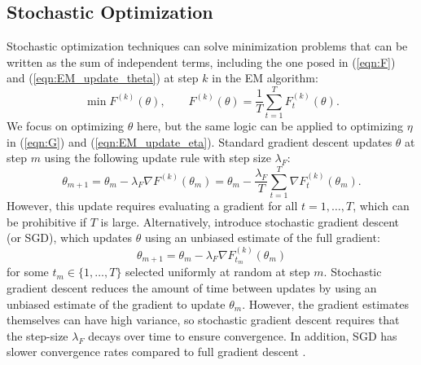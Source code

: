 \subsection{Stochastic Optimization}

Stochastic optimization techniques can solve minimization problems that can be written as the sum of independent terms, including the one posed in (\ref{eqn:F}) and (\ref{eqn:EM_update_theta}) at step $k$ in the EM algorithm:
%
\begin{equation*}
    \min F^{(k)}(\theta), \qquad F^{(k)}(\theta) = \frac{1}{T}\sum_{t = 1}^T F^{(k)}_t(\theta).
\end{equation*}
%
We focus on optimizing $\theta$ here, but the same logic can be applied to optimizing $\eta$ in (\ref{eqn:G}) and (\ref{eqn:EM_update_eta}).
%
Standard gradient descent updates $\theta$ at step $m$ using the following update rule with step size $\lambda_F$:
%
\begin{equation*}
    \theta_{m+1} = \theta_{m} - \lambda_F \nabla F^{(k)}(\theta_{m}) =  \theta_{m} - \frac{\lambda_F}{T} \sum_{t=1}^T \nabla F^{(k)}_t(\theta_{m}).
\end{equation*}
%
However, this update requires evaluating a gradient for all $t = 1,\ldots,T$, which can be prohibitive if $T$ is large. Alternatively, \citet{Robbins:1951} introduce stochastic gradient descent (or SGD), which updates $\theta$ using an unbiased estimate of the full gradient:
%
\begin{equation*}
    \theta_{m+1} = \theta_{m} - \lambda_F \nabla F^{(k)}_{t_m}(\theta_{m})
\end{equation*}
%
for some $t_m \in \{1,\ldots,T\}$ selected uniformly at random at step $m$. Stochastic gradient descent reduces the amount of time between updates by using an unbiased estimate of the gradient to update $\theta_{m}$. However, the gradient estimates themselves can have high variance, so stochastic gradient descent requires that the step-size $\lambda_F$ decays over time to ensure convergence. In addition, SGD has slower convergence rates compared to full gradient descent \citep{Schmidt:2017}.

